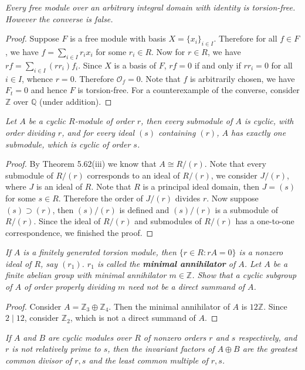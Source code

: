 \begin{problem}\em
Every free module over an arbitrary integral domain with identity is torsion-free. However the converse is false.
\end{problem}
\begin{proof}
Suppose $F$ is a free module with basis $X=\{x_i\}_{i\in I}$. Therefore for all $f\in F$, we have $f=\sum_{i\in I}r_ix_i$ for some $r_i\in R$. Now for $r\in R$, we have $rf=\sum_{i\in I}(rr_i)f_i$. Since $X$ is a basis of $F$, $rf=0$ if and only if $rr_i=0$ for all $i\in I$, whence $r=0$. Therefore $\mathcal{O}_f=0$. Note that $f$ is arbitrarily chosen, we have $F_t=0$ and hence $F$ is torsion-free. For a counterexample of the converse, consider $\mathbb{Z}$ over $\mathbb{Q}$ (under addition).
\end{proof}
\begin{problem}\em
Let $A$ be a cyclic $R$-module of order $r$, then every submodule of $A$ is cyclic, with order dividing $r$, and for every ideal $(s)$ containing $(r)$, $A$ has exactly one submodule, which is cyclic of order $s$.
\end{problem}
\begin{proof}
By Theorem 5.62(iii) we know that $A\cong R/(r)$. Note that every submodule of $R/(r)$ corresponds to an ideal of $R/(r)$, we consider $J/(r)$, where $J$ is an ideal of $R$. Note that $R$ is a principal ideal domain, then $J=(s)$ for some $s\in R$. Therefore the order of $J/(r)$ divides $r$. Now suppose $(s)\supset (r)$, then $(s)/(r)$ is defined and $(s)/(r)$ is a submodule of $R/(r)$. Since the ideal of $R/(r)$ and submodules of $R/(r)$ has a one-to-one correspondence, we finished the proof.
\end{proof}
\begin{problem}\em
If $A$ is a finitely generated torsion module, then $\{r\in R:rA=0\}$ is a nonzero ideal of $R$, say $(r_1)$. $r_1$ is called the \textbf{minimal annihilator} of $A$. Let $A$ be a finite abelian group with minimal annihilator $m\in\mathbb{Z}$. Show that a cyclic subgroup of $A$ of order properly dividing $m$ need not be a direct summand of $A$.
\end{problem}
\begin{proof}
Consider $A=\mathbb{Z}_3\oplus\mathbb{Z}_4$. Then the minimal annihilator of $A$ is $12\mathbb{Z}$. Since $2\mid 12$, consider $\mathbb{Z}_2$, which is not a direct summand of $A$.
\end{proof}
\begin{problem}\em
If $A$ and $B$ are cyclic modules over $R$ of nonzero orders $r$ and $s$ respectively, and $r$ is not relatively prime to $s$, then the invariant factors of $A\oplus B$ are the greatest common divisor of $r,s$ and the least common multiple of $r,s$.
\end{problem}
